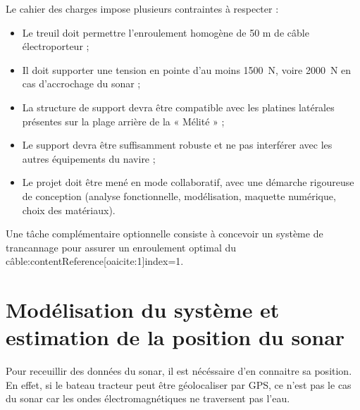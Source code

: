 \documentclass[12pt,a4paper]{article}
\begin{document}
Le cahier des charges impose plusieurs contraintes à respecter :


\begin{itemize}


  \item Le treuil doit permettre l’enroulement homogène de 50 m de câble électroporteur ;


  \item Il doit supporter une tension en pointe d’au moins 1500~N, voire 2000~N en cas d’accrochage du sonar ;


  \item La structure de support devra être compatible avec les platines latérales présentes sur la plage arrière de la « Mélité » ;


  \item Le support devra être suffisamment robuste et ne pas interférer avec les autres équipements du navire ;


  \item Le projet doit être mené en mode collaboratif, avec une démarche rigoureuse de conception (analyse fonctionnelle, modélisation, maquette numérique, choix des matériaux).


\end{itemize}






Une tâche complémentaire optionnelle consiste à concevoir un système de trancannage pour assurer un enroulement optimal du câble:contentReference[oaicite:1]{index=1}.
















\section{Modélisation du système et estimation de la position du sonar}






Pour receuillir des données du sonar, il est nécéssaire d'en connaitre sa position. En effet, si le bateau tracteur peut être géolocaliser par GPS, ce n'est pas le cas du sonar car les ondes électromagnétiques ne traversent pas l'eau.
\end{document}

